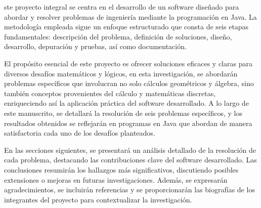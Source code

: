 \documentclass{IEEEcsmag}
\begin{document}
\maketitle
{}ste proyecto integral se centra en el desarrollo de un software diseñado para abordar y resolver problemas de ingeniería mediante la programación en Java. La metodología empleada sigue un enfoque estructurado que consta de seis etapas fundamentales: descripción del problema, definición de soluciones, diseño, desarrollo, depuración y pruebas, así como documentación.

El propósito esencial de este proyecto es ofrecer soluciones eficaces y claras para diversos desafíos matemáticos y lógicos, en esta investigación, se abordarán problemas específicos que involucran no solo cálculos geométricos y álgebra, sino también conceptos provenientes del cálculo y matemáticas discretas, enriqueciendo así la aplicación práctica del software desarrollado. A lo largo de este manuscrito, se detallará la resolución de seis problemas específicos, y los resultados obtenidos se reflejarán en programas en Java que abordan de manera satisfactoria cada uno de los desafíos planteados.

En las secciones siguientes, se presentará un análisis detallado de la resolución de cada problema, destacando las contribuciones clave del software desarrollado. Las conclusiones resumirán los hallazgos más significativos, discutiendo posibles extensiones o mejoras en futuras investigaciones. Además, se expresarán agradecimientos, se incluirán referencias y se proporcionarán las biografías de los integrantes del proyecto para contextualizar la investigación. 

\clearpage


\clearpage


\clearpage


\clearpage


\clearpage


\clearpage


\clearpage
\end{document}
